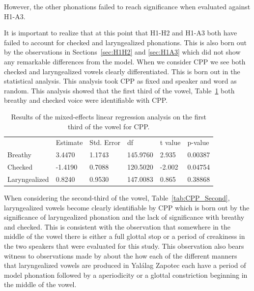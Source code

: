 \documentclass[12pt, letterpaper]{article}
\providecommand{\lsptoprule}{\midrule\toprule}
\providecommand{\lspbottomrule}{\bottomrule\midrule}
\begin{document}
However, the other phonations failed to reach significance when evaluated against H1-A3.

It is important to realize that at this point that H1-H2 and H1-A3 both have failed to account for checked and laryngealized phonations. This is also born out by the observations in Sections~\ref{sec:H1H2} and \ref{sec:H1A3} which did not show any remarkable differences from the model. When we consider CPP we see both checked and laryngealized vowels clearly differentiated. This is born out in the statistical analysis. This analysis took CPP as fixed and speaker and word as random. This analysis showed that the first third of the vowel, Table~\ref{tab:CPP_First} both breathy and checked voice were identifiable with CPP. 


\begin{table}[!h]
	\centering
	\caption{Results of the mixed-effects linear regression analysis on the first third of the vowel for CPP. }
	\label{tab:CPP_First}
	 \begin{tabular}{llllll}
	  \lsptoprule
						&  Estimate  & Std. Error & df & t value & p-value \\
	  	Breathy   		&  3.4470   &  1.1743 & 145.9760 &  2.935 & 0.00387 \\
		Checked    		& -1.4190   &  0.7088 & 120.5020 & -2.002 & 0.04754 \\
		Laryngealized	&  0.8240   &  0.9530 & 147.0083 &  0.865 & 0.38868 \\
	  \lspbottomrule
	 \end{tabular}
\end{table}

When considering the second-third of the vowel, Table~\ref{tab:CPP_Second}, laryngealized vowels become clearly identifiable by CPP which is born out by the significance of laryngealized phonation and the lack of significance with breathy and checked. This is consistent with the observation that somewhere in the middle of the vowel there is either a full glottal stop or a period of creakiness in the two speakers that were evaluated for this study. This observation also bears witness to observations made by \citet{avelinoAcousticElectroglottographicAnalyses2010} about the how each of the different manners that laryngealized vowels are produced in Yalálag Zapotec each have a period of model phonation followed by a aperiodicity or a glottal constriction beginning in the middle of the vowel. 
\end{document}
